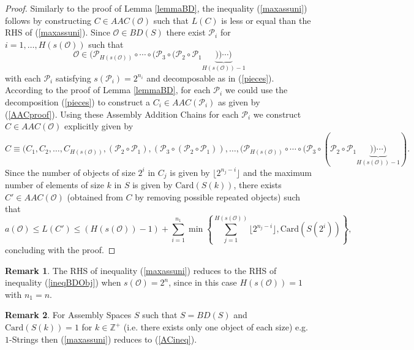 \documentclass[letterpaper,12pt]{article}
\theoremstyle{definition}
\newtheorem{remark}{Remark}
\begin{document}
\begin{proof}
Similarly to the proof of Lemma \ref{lemmaBD}, the inequality (\ref{maxassuni}) follows by constructing $C \in AAC(\mathscr{O})$ such that $L(C)$ is less or equal than the RHS of (\ref{maxassuni}). Since $\mathscr{O} \in BD(S)$ there exist $\mathscr{P}_i$ for $i=1,\dots,H(s(\mathscr{O}))$ such that 
\begin{equation*}
        \mathscr{O} \in (\mathscr{P}_{H(s(\mathscr{O}))} \circ \cdots \circ  (\mathscr{P}_3 \circ (\mathscr{P}_{2} \circ \mathscr{P}_{1} \underbrace{)) \cdots)}_{H(s(\mathscr{O}))-1}
    \end{equation*}
with each $\mathscr{P}_i$ satisfying $s(\mathscr{P}_i)=2^{n_i}$ and decomposable as in (\ref{pieces}). According to the proof of Lemma \ref{lemmaBD}, for each $\mathscr{P}_i$ we could use the decomposition (\ref{pieces}) to construct a $C_i \in AAC(\mathscr{P}_i)$ as given by (\ref{AACproof}). Using these Assembly Addition Chains for each $\mathscr{P}_i$ we construct $C \in AAC(\mathscr{O})$ explicitly given by   
\begin{equation*}
 C \equiv   (C_1,C_2,\dots,C_{H(s(\mathscr{O}))},(\mathscr{P}_2 \circ \mathscr{P}_1),(\mathscr{P}_3 \circ (\mathscr{P}_2 \circ \mathscr{P}_1)),\dots,(\mathscr{P}_{H(s(\mathscr{O}))} \circ \cdots \circ  (\mathscr{P}_3 \circ (\mathscr{P}_{2} \circ \mathscr{P}_{1} \underbrace{)) \cdots)}_{H(s(\mathscr{O}))-1} ).
\end{equation*}
Since the number of objects of size $2^i$ in $C_j$ is given by $\lfloor 2^{n_j-i} \rfloor$ and the maximum number of elements of size $k$ in $S$ is given by $\text{Card}(S(k))$, there exists $C' \in AAC(\mathscr{O})$ (obtained from $C$ by removing possible repeated objects) such that  
\begin{equation*}
    a(\mathscr{O}) \leq L(C') \leq (H(s(\mathscr{O}))-1) + \sum_{i=1}^{n_1} \min \left\{ \sum_{j=1}^{H(s(\mathscr{O}))}  \lfloor 2^{n_j-i} \rfloor, \text{Card}(S(2^{i})) \right\},
\end{equation*}
concluding with the proof.
\end{proof}

\begin{remark}
    The RHS of inequality (\ref{maxassuni}) reduces to the RHS of inequality (\ref{ineqBDObj}) when $s(\mathscr{O})=2^n$, since in this case $H(s(\mathscr{O}))=1$ with $n_1=n$.     
\end{remark}

\begin{remark}
For Assembly Spaces $S$ such that $S=BD(S)$ and $\text{Card}(S(k))=1$ for $k \in \mathbb{Z}^+$ (i.e. there exists only one object of each size) e.g. $1$-Strings then (\ref{maxassuni}) reduces to (\ref{ACineq}).    
\end{remark}
\end{document}
